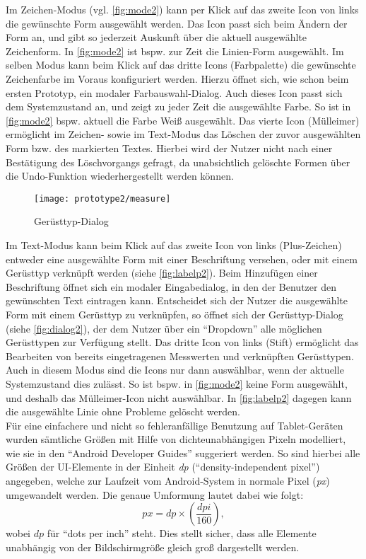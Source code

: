Im Zeichen-Modus (vgl. \autoref{fig:mode2}) kann per Klick auf das zweite Icon von links die gewünschte Form ausgewählt werden. 
Das Icon passt sich beim Ändern der Form an, und gibt so jederzeit Auskunft über die aktuell ausgewählte Zeichenform.
In \autoref{fig:mode2} ist bspw. zur Zeit die Linien-Form ausgewählt.
Im selben Modus kann beim Klick auf das dritte Icons (Farbpalette) die gewünschte Zeichenfarbe im Voraus konfiguriert werden. 
Hierzu öffnet sich, wie schon beim ersten Prototyp, ein modaler Farbauswahl-Dialog.
Auch dieses Icon passt sich dem Systemzustand an, und zeigt zu jeder Zeit die ausgewählte Farbe.
So ist in \autoref{fig:mode2} bspw. aktuell die Farbe Weiß ausgewählt.
Das vierte Icon (Mülleimer) ermöglicht im Zeichen- sowie im Text-Modus das Löschen der zuvor ausgewählten Form bzw. des markierten Textes. 
Hierbei wird der Nutzer nicht nach einer Bestätigung des Löschvorgangs gefragt, da unabsichtlich gelöschte Formen über die Undo-Funktion wiederhergestellt werden können. \\

\begin{wrapfigure}{R}{0.4\textwidth}
  \centering
  \texttt{[image: prototype2/measure]}
  \caption{Gerüsttyp-Dialog}
  \label{fig:dialog2}
\end{wrapfigure}

Im Text-Modus kann beim Klick auf das zweite Icon von links (Plus-Zeichen) entweder eine ausgewählte Form mit einer Beschriftung versehen, oder mit einem Gerüsttyp verknüpft werden (siehe \autoref{fig:labelp2}).
Beim Hinzufügen einer Beschriftung öffnet sich ein modaler Eingabedialog, in den der Benutzer den gewünschten Text eintragen kann.
Entscheidet sich der Nutzer die ausgewählte Form mit einem Gerüsttyp zu verknüpfen, so öffnet sich der Gerüsttyp-Dialog (siehe \autoref{fig:dialog2}), der dem Nutzer über ein ``Dropdown'' alle möglichen Gerüsttypen zur Verfügung stellt.
Das dritte Icon von links (Stift) ermöglicht das Bearbeiten von bereits eingetragenen Messwerten und verknüpften Gerüsttypen.
Auch in diesem Modus sind die Icons nur dann auswählbar, wenn der aktuelle Systemzustand dies zulässt. 
So ist bspw. in \autoref{fig:mode2} keine Form ausgewählt, und deshalb das Mülleimer-Icon nicht auswählbar. 
In \autoref{fig:labelp2} dagegen kann die ausgewählte Linie ohne Probleme gelöscht werden. \\

Für eine einfachere und nicht so fehleranfällige Benutzung auf Tablet-Geräten wurden sämtliche Größen mit Hilfe von dichteunabhängigen Pixeln modelliert, wie sie in den ``Android Developer Guides'' suggeriert werden.
So sind hierbei alle Größen der UI-Elemente in der Einheit \emph{dp} (``density-independent pixel'') angegeben, welche zur Laufzeit vom Android-System in normale Pixel (\emph{px}) umgewandelt werden.
Die genaue Umformung lautet dabei wie folgt:
\[
  px =  dp \times (\frac{dpi}{160}),
\]
wobei $dp$ für ``dots per inch'' steht.
Dies stellt sicher, dass alle Elemente unabhängig von der Bildschirmgröße gleich groß dargestellt werden.

